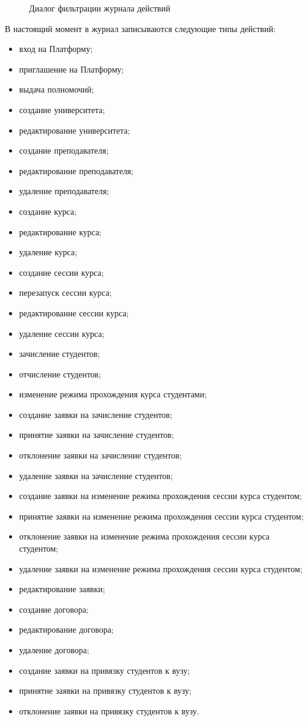 \begin{figure}[H]
	\caption{Диалог фильтрации журнала действий}
	\label{img:employee:log_list_filter}
\end{figure}

В настоящий момент в журнал записываются следующие типы действий:

\begin{itemize}
	\item вход на Платформу;
    \item приглашение на Платформу;
    \item выдача полномочий;
    \item создание университета;
    \item редактирование университета;
    \item создание преподавателя;
    \item редактирование преподавателя;
    \item удаление преподавателя;
    \item создание курса;
    \item редактирование курса;
    \item удаление курса;
    \item создание сессии курса;
    \item перезапуск сессии курса;
    \item редактирование сессии курса;
    \item удаление сессии курса;
    \item зачисление студентов;
    \item отчисление студентов;
    \item изменение режима прохождения курса студентами;
    \item создание заявки на зачисление студентов;
    \item принятие заявки на зачисление студентов;
    \item отклонение заявки на зачисление студентов;
    \item удаление заявки на зачисление студентов;
    \item создание заявки на изменение режима прохождения сессии курса студентом;
    \item принятие заявки на изменение режима прохождения сессии курса студентом;
    \item отклонение заявки на изменение режима прохождения сессии курса студентом;
    \item удаление заявки на изменение режима прохождения сессии курса студентом;
    \item редактирование заявки;
    \item создание договора;
    \item редактирование договора;
    \item удаление договора;
    \item создание заявки на привязку студентов к вузу;
    \item принятие заявки на привязку студентов к вузу;
    \item отклонение заявки на привязку студентов к вузу.
\end{itemize}


